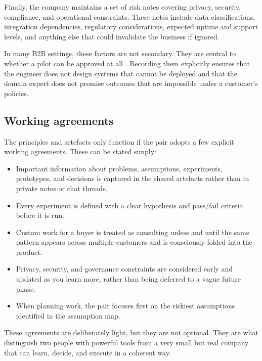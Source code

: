 \documentclass[10pt, a4paper, twocolumn]{article} %
\begin{document}
Finally, the company maintains a set of risk notes covering privacy, security, compliance, and operational constraints. These notes include data classifications, integration dependencies, regulatory considerations, expected uptime and support levels, and anything else that could invalidate the business if ignored.

In many B2B settings, these factors are not secondary. They are central to whether a pilot can be approved at all \citep{forsgren2018accelerate}. Recording them explicitly ensures that the engineer does not design systems that cannot be deployed and that the domain expert does not promise outcomes that are impossible under a customer’s policies.

\newpage
\subsection{Working agreements}

The principles and artefacts only function if the pair adopts a few explicit working agreements. These can be stated simply:

\begin{itemize}
  \item Important information about problems, assumptions, experiments, prototypes, and decisions is captured in the shared artefacts rather than in private notes or chat threads.
  \item Every experiment is defined with a clear hypothesis and pass/fail criteria before it is run.
  \item Custom work for a buyer is treated as consulting unless and until the same pattern appears across multiple customers and is consciously folded into the product.
  \item Privacy, security, and governance constraints are considered early and updated as you learn more, rather than being deferred to a vague future phase.
  \item When planning work, the pair focuses first on the riskiest assumptions identified in the assumption map.
\end{itemize}

These agreements are deliberately light, but they are not optional. They are what distinguish two people with powerful tools from a very small but real company that can learn, decide, and execute in a coherent way.





\clearpage
\end{document}

